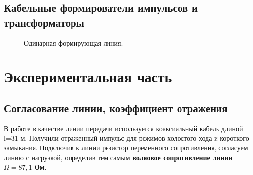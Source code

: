 \documentclass[12pt]{article}
\begin{document}
\begin{flushleft}
\subsection{Кабельные формирователи импульсов и трансформаторы}
\begin{figure}[!h]
\caption{Одинарная формирующая линия.}
\label{ris:image}
\end{figure}
\section{Экспериментальная часть}
\subsection{Согласование линии, коэффициент отражения}
В работе в качестве линии передачи используется коаксиальный кабель длиной l=31 м. Получили отраженный импульс для режимов холостого хода и короткого замыкания. Подключив к линии резистор переменного сопротивления, согласуем линию с нагрузкой, определив тем самым \textbf{волновое сопротивление линии $\Omega =87,1$ Ом}.


\end{flushleft}
\end{document}
